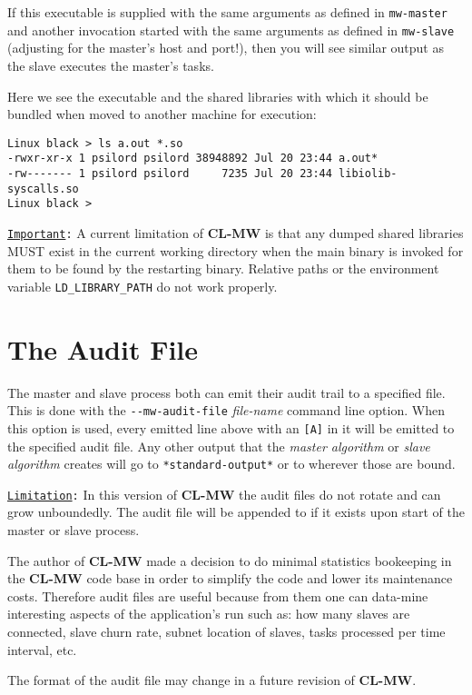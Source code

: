 \documentclass[titlepage,12pt]{book}
\newcommand{\xsmall}{\latexhtml{\small}{}}
\newcommand{\xnormalsize}{\latexhtml{\normalsize}{}}
\newcommand{\clmw}{\xsmall\textbf{CL-MW}\xnormalsize\xspace}
\newcommand{\sa}{\textit{slave algorithm}\xspace}
\newcommand{\ma}{\textit{master algorithm}\xspace}
\newcommand{\dash}{\texttt{-}}
\newcommand{\func}[1]{\xsmall\mbox{\uppercase{\texttt{#1}}}\xnormalsize\xspace}
\newcommand{\var}[1]{\texttt{#1}\xspace}
\newcommand{\EnvVar}[1]{\texttt{#1}\xspace}
\newcommand{\OptionV}[2]{\dash\dash\texttt{#1} \textit{#2}}
\newcommand{\Important}{\texttt{\underline{Important}:}\xspace}
\newcommand{\Limitation}{\texttt{\underline{Limitation}:}\xspace}
\begin{document}
If this executable is supplied with the same arguments as defined in
\func{mw-master} and another invocation started with the same arguments
as defined in \func{mw-slave} (adjusting for the master's host and
port!), then you will see similar output as the slave executes the
master's tasks.

Here we see the executable and the shared libraries with which it should be
bundled when moved to another machine for execution:

\small
\begin{verbatim}
Linux black > ls a.out *.so
-rwxr-xr-x 1 psilord psilord 38948892 Jul 20 23:44 a.out*
-rw------- 1 psilord psilord     7235 Jul 20 23:44 libiolib-syscalls.so
Linux black >
\end{verbatim}
\normalsize

\Important A current limitation of \clmw is that any dumped
shared libraries MUST exist in the current working directory
when the main binary is invoked for them to be found by the
restarting binary. Relative paths or the environment variable
\EnvVar{LD\_LIBRARY\_PATH} do not work properly.

\section{The Audit File}

The master and slave process both can emit their
audit trail to a specified file. This is done with the
\OptionV{mw-audit-file}{file-name} command line option. When this
option is used, every emitted line above with an \texttt{[A]} in it
will be emitted to the specified audit file. Any other output that
the \ma or \sa creates will go to \var{*standard-output*} or to
wherever those are bound. 

\Limitation In this version of \clmw the audit files do not rotate
and can grow unboundedly. The audit file will be appended to if it
exists upon start of the master or slave process.

The author of \clmw made a decision to do minimal statistics
bookeeping in the \clmw code base in order to simplify the code and
lower its maintenance costs.  Therefore audit files are useful because
from them one can data-mine interesting aspects of the application's
run such as: how many slaves are connected, slave churn rate, subnet
location of slaves, tasks processed per time interval, etc.

The format of the audit file may change in a future revision of \clmw.
\end{document}
